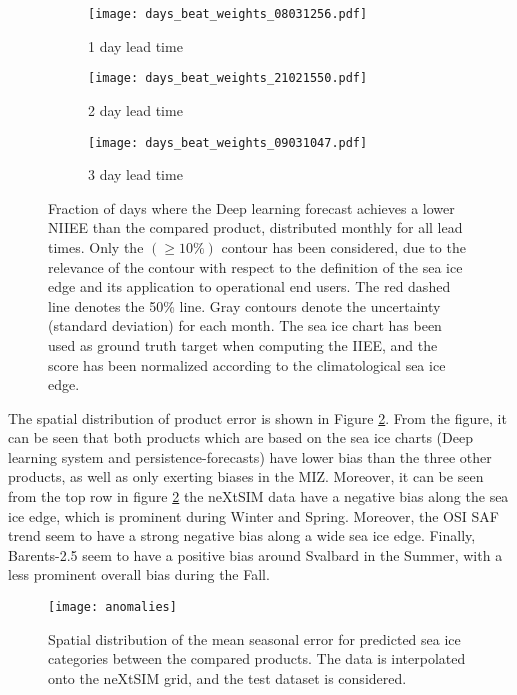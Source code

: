 \documentclass[../main/thesis.tex]{subfiles}
\begin{document}
\begin{figure}
    \centering
    \begin{subfigure}{0.32\textwidth}
        \caption{1 day lead time}
        \texttt{[image: days\_beat\_weights\_08031256.pdf]}
    \end{subfigure}
    \begin{subfigure}{0.32\textwidth}
        \caption{2 day lead time}
        \texttt{[image: days\_beat\_weights\_21021550.pdf]}
    \end{subfigure}
    \begin{subfigure}{0.32\textwidth}
        \caption{3 day lead time}
        \texttt{[image: days\_beat\_weights\_09031047.pdf]}
    \end{subfigure}
    \caption{\label{fig:days-beat}Fraction of days where the Deep learning forecast achieves a lower NIIEE than the compared product, distributed monthly for all lead times. Only the $(\geq10\%)$ contour has been considered, due to the relevance of the contour with respect to the definition of the sea ice edge and its application to operational end users. The red dashed line denotes the 50\% line. Gray contours denote the uncertainty (standard deviation) for each month. The sea ice chart has been used as ground truth target when computing the IIEE, and the score has been normalized according to the climatological sea ice edge.}
\end{figure}

The spatial distribution of product error is shown in Figure \ref{fig:anomalies}. From the figure, it can be seen that both products which are based on the sea ice charts (Deep learning system and persistence-forecasts) have lower bias than the three other products, as well as only exerting biases in the MIZ. Moreover, it can be seen from the top row in figure \ref{fig:anomalies} the neXtSIM data have a negative bias along the sea ice edge, which is prominent during Winter and Spring. Moreover, the OSI SAF trend seem to have a strong negative bias along a wide sea ice edge. Finally, Barents-2.5 seem to have a positive bias around Svalbard in the Summer, with a less prominent overall bias during the Fall.

\begin{figure}
    \centering
    \texttt{[image: anomalies]}
    \caption{\label{fig:anomalies}Spatial distribution of the mean seasonal error for predicted sea ice categories between the compared products. The data is interpolated onto the neXtSIM grid, and the test dataset is considered.}
\end{figure}
\end{document}
